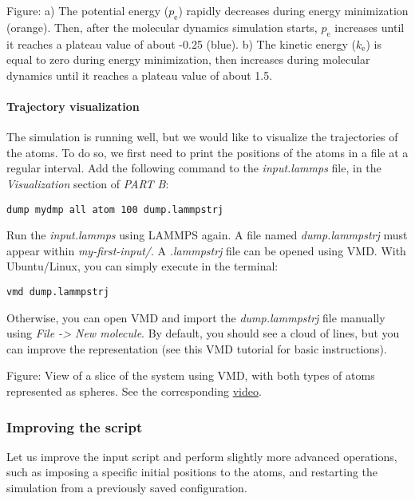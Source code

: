 {\color{red}Figure: a) The potential energy ($p_\text{e}$) rapidly decreases during energy minimization (orange). Then, after the molecular dynamics simulation starts, $p_\text{e}$ increases until it reaches a plateau value of about -0.25 (blue). b) The kinetic energy ($k_\text{e}$) is equal to zero during energy minimization, then increases during molecular dynamics until it reaches a plateau value of about 1.5.}

\paragraph{Trajectory visualization}

The simulation is running well, but we would like to visualize the trajectories of the atoms. To do so, we first need to print the positions of the atoms in a file at a regular interval. Add the following command to the \textit{input.lammps} file, in the \textit{Visualization} section of \textit{PART B}:
\begin{verbatim}
dump mydmp all atom 100 dump.lammpstrj
\end{verbatim}
Run the \textit{input.lammps} using LAMMPS again. A file named \textit{dump.lammpstrj} must appear within \textit{my-first-input/}. A \textit{.lammpstrj} file can be opened using VMD. {\color{red}With Ubuntu/Linux}, you can simply execute in the terminal:
\begin{verbatim}
vmd dump.lammpstrj
\end{verbatim}
Otherwise, you can open VMD and import the \textit{dump.lammpstrj} file manually using \textit{File -> New molecule}.
By default, you should see a cloud of lines, but you can improve the representation (see this {\color{red}VMD tutorial} for basic instructions).

{\color{red}Figure: View of a slice of the system using VMD, with both types of atoms represented as spheres. See the corresponding \href{https://youtu.be/vdSIJM5fVJE}{video}.}


\subsubsection{Improving the script}

Let us improve the input script and perform slightly more advanced operations, such as imposing a specific initial
positions to the atoms, and restarting the simulation from a previously saved configuration. 

